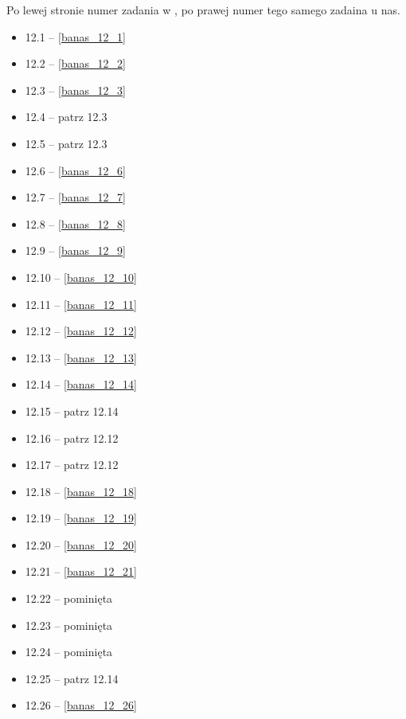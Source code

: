 Po lewej stronie numer zadania w \cite{banas_wedrychowicz}, po prawej numer tego samego zadaina u nas.

\begin{multicols}{3}
\begin{itemize}
    \item 12.1 -- \ref{banas_12_1}
    \item 12.2 -- \ref{banas_12_2}
    \item 12.3 -- \ref{banas_12_3}
    \item 12.4 -- patrz 12.3
    \item 12.5 -- patrz 12.3
    \item 12.6 -- \ref{banas_12_6}
    \item 12.7 -- \ref{banas_12_7}
    \item 12.8 -- \ref{banas_12_8}
    \item 12.9 -- \ref{banas_12_9}
    \item 12.10 -- \ref{banas_12_10}
    \item 12.11 -- \ref{banas_12_11}
    \item 12.12 -- \ref{banas_12_12}
    \item 12.13 -- \ref{banas_12_13}
    \item 12.14 -- \ref{banas_12_14}
    \item 12.15 -- patrz 12.14
    \item 12.16 -- patrz 12.12
    \item 12.17 -- patrz 12.12
    \item 12.18 -- \ref{banas_12_18}
    \item 12.19 -- \ref{banas_12_19}
    \item 12.20 -- \ref{banas_12_20}
    \item 12.21 -- \ref{banas_12_21}
    \item 12.22 -- pominięta
    \item 12.23 -- pominięta
    \item 12.24 -- pominięta
    \item 12.25 -- patrz 12.14
    \item 12.26 -- \ref{banas_12_26}

\end{itemize}
\end{multicols}
